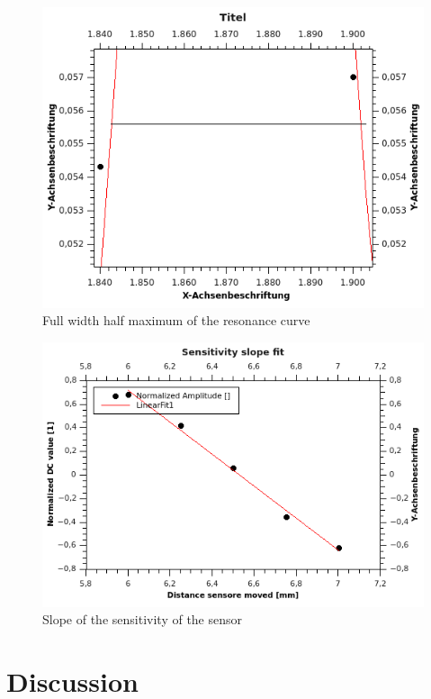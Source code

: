 \documentclass[12pt,a4paper]{article}
\begin{document}
\begin{multicols}{2}
\begin{figure}[H]
	\centering
	\includegraphics[scale=1.4]{../figures/ResonanzkurveHalbwertsbreite.png}
	\caption{Full width half maximum of the resonance curve}
	\label{fig:resonanzkurvehmfuw}
\end{figure}

\begin{figure}[H]
	\centering
	\includegraphics[scale=1.4]{../figures/Slopeofsensitivityofthesensor.png}
	\caption{Slope of the sensitivity of the sensor}
	\label{fig:sensorsensitivity}
\end{figure}


\section{Discussion}


\pagebreak




\end{multicols}
\end{document}
